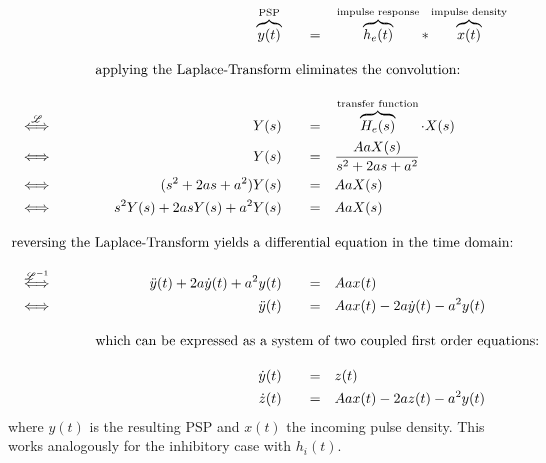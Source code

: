 \begin{alignat}{5}
    &                                           & &&          \overbrace{y(t)}^{\text{PSP}} \quad &&=& \quad \overbrace{h_e(t)}^{\text{impulse response}} \ast \overbrace{x(t)}^{\text{impulse density}} \label{eq:convolution} \\[1em]
    &                                           & \omit\rlap{applying the Laplace-Transform eliminates the convolution:}                 \nonumber \\[1em]
    &  \stackrel{\mathscr{L}}{\iff} \qquad      & &&                             Y(s) \quad &&=& \quad \overbrace{H_e(s)}^{\text{transfer function}} \cdot X(s)  \label{eq:laplace_domain} \\
    &  \iff                                     & &&                             Y(s) \quad &&=& \quad \frac{AaX(s)}{s^2+2as+a^2}  \nonumber \\
    &  \iff                                     & &&               (s^2+2as+a^2) Y(s) \quad &&=& \quad AaX(s) \nonumber \\
    &  \iff                                     & &&          s^2Y(s)+2asY(s)+a^2Y(s) \quad &&=& \quad AaX(s) \nonumber \\[1em]
    \omit\rlap{reversing the Laplace-Transform yields a differential equation in the time domain:}     \nonumber \\[1em]
    &  \stackrel{\mathscr{L}^{-1}}{\iff} \qquad & && \ddot{y}(t)+2a\dot{y}(t)+a^2y(t) \quad &&=& \quad Aax(t) \nonumber \\
    &  \iff                                     & &&                      \ddot{y}(t) \quad &&=& \quad Aax(t)-2a\dot{y}(t)-a^2y(t)  \label{eq:sec_ord_nmm} \\[1em]
    &                                           & \omit\rlap{which can be expressed as a system of two coupled first order equations:}                 \nonumber \\[1em]
    &                                           & &&                       \dot{y}(t) \quad &&=& \quad z(t)  \label{eq:y_t}\\
    &                                           & &&                       \dot{z}(t) \quad &&=& \quad Aax(t)-2az(t)-a^2y(t)   \label{eq:z_t}
\end{alignat}
where $y(t)$ is the resulting PSP and $x(t)$ the incoming pulse density. This works analogously for the inhibitory case with $h_i(t)$.


